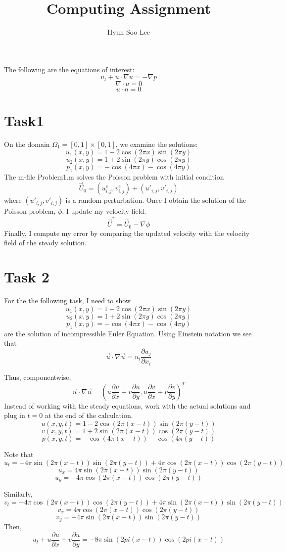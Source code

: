 \documentclass{article}
\title{Computing Assignment}
\author{Hyun Soo Lee}
\begin{document}
\maketitle

\lstset{language=Matlab}
The following are the equations of interest:
$$u_t + u\cdot\nabla u = -\nabla p$$
$$\nabla \cdot u = 0$$
$$u \cdot n = 0$$
\section*{Task1}
On the domain $\Omega_1 = [0, 1] \times [0, 1]$, we examine the solutions:
$$u_1(x, y) = 1 - 2\cos(2\pi x)\sin(2\pi y)$$
$$u_2(x, y) = 1 + 2\sin(2\pi y)\cos(2\pi y)$$
$$p_1(x, y) = -\cos(4\pi x) - \cos(4\pi y)$$
The m-file Problem1.m solves the Poisson problem with initial condition
$$\vec{U}_0 = (u^e_{i, j}, v^e_{i, j}) + (u'_{i, j}, v'_{i, j})$$
where $(u'_{i, j}, v'_{i, j})$ is a random perturbation. Once I obtain the solution of the Poisson
problem, $\phi$, I update my velocity field.
$$\vec{U}^* = \vec{U}_0 - \nabla \phi$$
Finally, I compute my error by comparing the updated velocity with the velocity field of the 
steady solution.

\section*{Task 2}
For the the following task, I need to show
$$u_1(x, y) = 1 - 2\cos(2\pi x)\sin(2\pi y)$$
$$u_2(x, y) = 1 + 2\sin(2\pi y)\cos(2\pi y)$$
$$p_1(x, y) = -\cos(4\pi x) - \cos(4\pi y)$$
are the solution of incompressible Euler Equation.\newline
Using Einstein notation we see that 
$$\vec{u}\cdot\nabla\vec{u} = u_i\frac{\partial u_j}{\partial x_i}$$

Thus, componentwise,
$$\vec{u}\cdot\nabla\vec{u} = (u\frac{\partial u}{\partial x} + v\frac{\partial u}{\partial y}, u\frac{\partial v}{\partial x} + v\frac{\partial v}{\partial y})^T$$
Instead of working with the steady equations, work with the actual solutions and plug in $t = 0$ at the end of the calculation.
$$u(x, y, t) = 1 - 2\cos(2\pi(x-t))\sin(2\pi(y-t))$$
$$v(x, y, t) = 1 + 2\sin(2\pi(x-t))\cos(2\pi(y-t))$$
$$p(x, y, t) = -\cos(4\pi(x-t)) - \cos(4\pi(y-t))$$

Note that
$$u_t = -4\pi\sin(2\pi(x-t))\sin(2\pi(y-t)) + 4\pi\cos(2\pi(x-t))\cos(2\pi(y-t))$$
$$u_x = 4\pi\sin(2\pi(x-t))\sin(2\pi(y-t))$$
$$u_y = -4\pi\cos(2\pi(x-t))\cos(2\pi(y-t))$$

Similarly,
$$v_t = -4\pi\cos(2\pi(x-t))\cos(2\pi(y-t)) + 4\pi\sin(2\pi(x-t))\sin(2\pi(y-t))$$
$$v_x = 4\pi\cos(2\pi(x-t))\cos(2\pi(y-t))$$
$$v_y = -4\pi\sin(2\pi(x-t))\sin(2\pi(y-t))$$
Then, 
$$u_t + u\frac{\partial u}{\partial x} + v\frac{\partial u}{\partial y} = -8\pi\sin(2pi(x-t))\cos(2pi(x - t))$$
\end{document}

